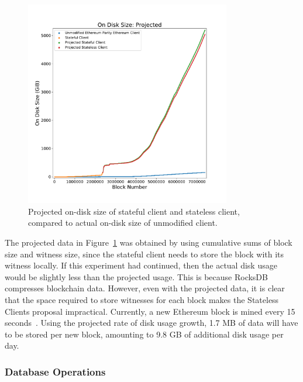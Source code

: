 \documentclass[12pt]{article}
\newcommand{\System}{Stateless Clients\xspace}
\newcommand{\figurewidth}{0.8\textwidth}
\begin{document}
\begin{figure}[H]
  \centering
  \includegraphics[width=\figurewidth]{../figures/results/graphs/background/projected-on-disk-size.pdf}
  \caption{Projected on-disk size of stateful client and stateless client, compared to actual on-disk size of unmodified client.}
  \label{fig:projectedondisksize}
\end{figure}

The projected data in Figure~\ref{fig:projectedondisksize} was obtained by using cumulative sums of block size and witness size, since the stateful client needs to store the block with its witness locally. If this experiment had continued, then the actual disk usage would be slightly less than the projected usage. This is because RocksDB compresses blockchain data. However, even with the projected data, it is clear that the space required to store witnesses for each block makes the \System proposal impractical. Currently, a new Ethereum block is mined every 15 seconds~\cite{ethereumblocktime}. Using the projected rate of disk usage growth, 1.7 MB of data will have to be stored per new block, amounting to 9.8 GB of additional disk usage per day.

\subsubsection{Database Operations}
\end{document}
